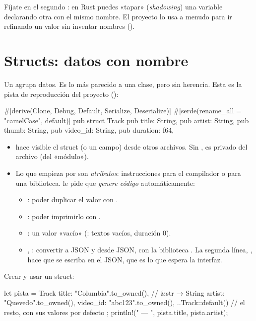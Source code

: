 Fíjate en el segundo : en Rust puedes «tapar» (\emph{shadowing}) una variable
declarando otra con el mismo nombre. El proyecto lo usa a menudo para ir refinando un valor
sin inventar nombres ().

\section{Structs: datos con nombre}

Un  agrupa datos. Es lo más parecido a una clase, pero sin herencia. Esta es la
pista de reproducción del proyecto ():

\begin{rust}
#[derive(Clone, Debug, Default, Serialize, Deserialize)]
#[serde(rename_all = "camelCase", default)]
pub struct Track {
    pub title: String,
    pub artist: String,
    pub thumb: String,
    pub video_id: String,
    pub duration: f64,
}
\end{rust}

\begin{itemize}
  \item {} hace visible el struct (o un campo) desde otros archivos. Sin , es
  privado del archivo (del «módulo»).
  \item Lo que empieza por \cod{#[...]} son \emph{atributos}: instrucciones para el
  compilador o para una biblioteca. \cod{#[derive(...)]} le pide que \emph{genere código}
  automáticamente:
  \begin{itemize}
    \item {}: poder duplicar el valor con .
    \item {}: poder imprimirlo con .
    \item {}: un valor «vacío» (: textos vacíos, duración 0).
    \item {}, : convertir a JSON y desde JSON, con la biblioteca
    . La segunda línea, , hace que  se
    escriba  en el JSON, que es lo que espera la interfaz.
  \end{itemize}
\end{itemize}

Crear y usar un struct:

\begin{rust}
let pista = Track {
    title: "Columbia".to_owned(),     // &str → String
    artist: "Quevedo".to_owned(),
    video_id: "abc123".to_owned(),
    ..Track::default()                // el resto, con sus valores por defecto
};
println!("{} — {}", pista.title, pista.artist);
\end{rust}

